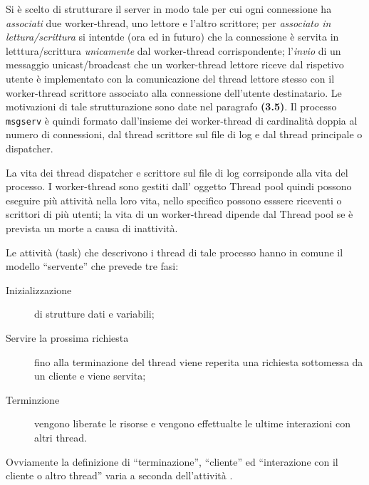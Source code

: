 \documentclass[a4paper,10pt]{article}
\begin{document}
Si \`e scelto di strutturare il server in modo tale per cui ogni
connessione ha \emph{associati} due worker-thread, uno lettore e
l'altro scrittore; per \emph{associato in lettura/scrittura} si
intentde (ora ed in futuro) che la connessione \`e servita in
letttura/scrittura \emph{unicamente} dal worker-thread corrispondente;
l'\emph{invio} di un messaggio unicast/broadcast che un worker-thread lettore
riceve dal rispetivo utente \`e implementato con la comunicazione del
thread lettore stesso con il worker-thread scrittore associato alla
connessione dell'utente destinatario. Le motivazioni di tale
strutturazione sono date nel paragrafo \textbf{(3.5)}. Il processo
\texttt{msgserv} \`e quindi formato dall'insieme dei worker-thread di
cardinalit\`a doppia al numero di connessioni, dal thread scrittore
sul file di log e dal thread principale o dispatcher.

La vita dei thread dispatcher e scrittore sul file di log corrsiponde
alla vita del processo. I worker-thread sono gestiti dall' oggetto
Thread pool quindi possono eseguire pi\`u attivit\`a nella loro vita,
nello specifico possono esssere riceventi o scrittori di pi\`u utenti;
la vita di un worker-thread dipende dal Thread pool se \`e prevista un
morte a causa di inattivit\`a. 

Le attivit\`a (task) che descrivono i thread di tale processo hanno in
comune il modello ``servente'' che prevede tre fasi:
\begin{description}
  \item[Inizializzazione] di strutture dati e variabili;
  \item[Servire la prossima richiesta] fino alla terminazione del
    thread viene reperita una richiesta sottomessa da un cliente e
    viene servita;
  \item[Terminzione] vengono liberate le risorse e vengono effettualte
    le ultime interazioni con altri thread.
\end{description}
Ovviamente la definizione di ``terminazione'', ``cliente'' ed ``interazione con
il cliente o altro thread'' varia a seconda dell'attivit\`a .
\end{document}
